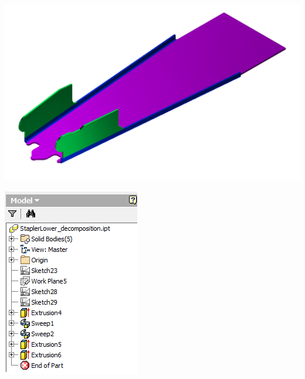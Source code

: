 \begin{minipage}{\linewidth}
\begin{minipage}[c]{0.62\linewidth}
\includegraphics[width=\linewidth,valign=t]{images/StaplerLower_decomposition_model}
 \label{fig:results:StaplerLower_decompositionmodel}
\end{minipage}
\quad
\begin{minipage}[c]{0.3\linewidth}
\includegraphics[width=\linewidth,valign=t]{images/StaplerLower_decomposition_tree}
 \label{fig:results:StaplerLower_decompositiontree}
\end{minipage}
\end{minipage}

